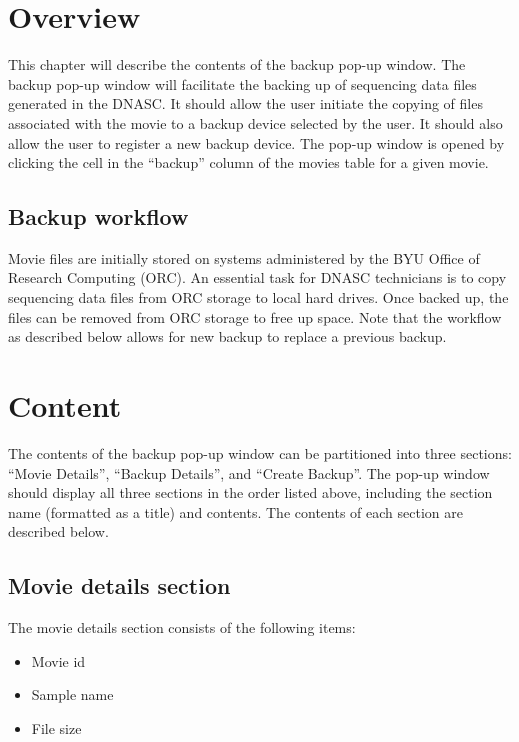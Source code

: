 
\section{Overview}

\noindent This chapter will describe the contents of the backup pop-up window.
The backup pop-up window will facilitate the backing up of sequencing data files 
generated in the DNASC. It should allow the user initiate the copying of
files associated with the movie to a backup device selected by the user.
It should also allow the user to register a new backup device. The pop-up window 
is opened by clicking the cell in the ``backup'' column of the movies table for a 
given movie.

\subsection{Backup workflow}
Movie files are initially stored on systems administered by the BYU Office of 
Research Computing (ORC). An essential task for DNASC technicians is to copy sequencing 
data files from ORC storage to local hard drives. Once backed up, the files can be 
removed from ORC storage to free up space. Note that the workflow as described below
allows for new backup to replace a previous backup.

\section{Content}

The contents of the backup pop-up window can be partitioned into three sections: 
``Movie Details'', ``Backup Details'', and ``Create Backup''. The pop-up window should 
display all three sections in the order listed above, including the section name 
(formatted as a title) and contents. The contents of each section are described below. 

\subsection{Movie details section}

The movie details section consists of the following items:
\begin{itemize}\itemsep1pt
  \item Movie id
  \item Sample name
  \item File size
\end{itemize}


